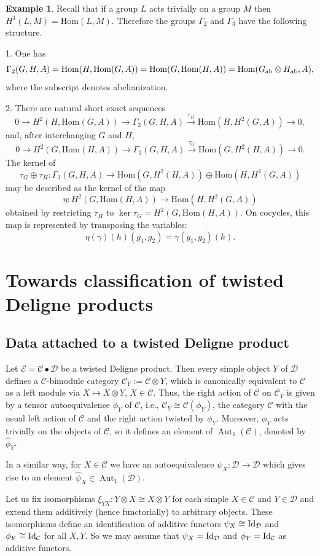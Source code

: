 \documentclass[12pt]{amsart}
\numberwithin{equation}{section}
\theoremstyle{definition}
\newtheorem{example}[theorem]{Example}
\newcommand{\Hom}{\text{Hom}}
\newcommand{\Aut}{\text{Aut}}
\newcommand{\1}{_{(1)}}
\newcommand{\2}{_{(2)}}
\newcommand{\3}{_{(3)}}
\newcommand{\4}{_{(4)}}
\newcommand{\5}{_{(5)}}
\newcommand{\6}{_{(6)}}
\newcommand{\C}{\mathcal{C}}
\theoremstyle{plain}
\theoremstyle{definition}
\theoremstyle{remark}
\def\C{\mathcal{C}}
\def\D{\mathcal{D}}
\def\E{\mathcal{E}}
\def\Aut{\mathop{\mathrm{Aut}}\nolimits}
\def\Hom{\mathrm{Hom}}
\begin{document}
\begin{example}\label{ex1} Recall that if a group $L$ acts trivially on a group $M$ then $H^1(L,M)=\Hom(L,M)$. 
Therefore the groups $\Gamma_2$ and $\Gamma_3$ have the following structure. 

1. One has \scriptsize
$$
\Gamma_2(G,H,A)=\Hom(H,\Hom(G,A))=\Hom(G,\Hom(H,A))=\Hom(G_{\rm ab}\otimes H_{\rm ab},A),
$$ \normalsize
where the subscript denotes abelianization. 

2. There are natural short exact sequences
\[
0\to H^2(H,\Hom(G,A))\to \Gamma_3(G,H,A)\xrightarrow{\tau_H} \Hom(H,H^2(G,A))\to 0,
\]
and, after interchanging $G$ and $H$,
\[
0\to H^2(G,\Hom(H,A))\to \Gamma_3(G,H,A)\xrightarrow{\tau_G} \Hom(G,H^2(H,A))\to 0.
\]
The kernel of
\[
\tau_G\oplus\tau_H:\Gamma_3(G,H,A)\to \Hom(G,H^2(H,A))\oplus \Hom(H,H^2(G,A))
\]
may be described as the kernel of the map
\[
\eta: H^2(G,\Hom(H,A))\to \Hom(H,H^2(G,A))
\]
obtained by restricting $\tau_H$ to $\ker\tau_G=H^2(G,\Hom(H,A))$.  On cocycles, this map is represented by transposing the variables:
\[
\eta(\gamma)(h)(g_1,g_2)=\gamma(g_1,g_2)(h).
\]
\end{example}

\section{Towards classification of twisted Deligne products} 

\subsection{Data attached to a twisted Deligne product} 

Let $\E=\C\bullet \D$ be a twisted Deligne product. Then every simple object $Y$ of $\D$ defines a $\C$-bimodule category $\C_Y:=\C\otimes Y$, which is canonically equivalent to $\C$ as a left module via $X\mapsto X\otimes Y$, $X\in \C$. Thus, the right action of $\C$ on $\C_Y$ is given by a tensor autoequivalence $\phi_Y$ of $\C$, i.e., $\C_Y\cong \C(\phi_Y)$, the category $\C$ with the usual left action of $\C$ and the right action twisted by $\phi_Y$. Moreover, $\phi_Y$ acts trivially on the objects of $\C$, so it defines an element of $\Aut_1(\C)$, denoted by $\widehat{\phi}_Y$.

In a similar way, for $X\in \C$ we have an autoequivalence $\psi_X: \D\to \D$ 
which gives rise to an element $\widehat{\psi}_X\in \Aut_1(\D)$. 

Let us fix isomorphisms $\xi_{YX}: Y\otimes X\cong X\otimes Y$ for each simple $X\in \C$ and $Y\in \D$ and extend them additively (hence functorially) to arbitrary objects. These isomorphisms 
define an identification of additive functors $\psi_X\cong {\rm Id}_\D$ and $\phi_Y\cong {\rm Id}_\C$ for all $X,Y$. So we may assume that 
$\psi_X={\rm Id}_\D$ and $\phi_Y={\rm Id}_\C$ as additive functors.
\end{document}
